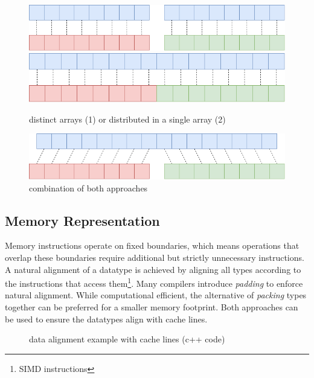 \documentclass{article}
\begin{document}
\begin{figure}[ht]
    \centering
    \includegraphics[scale=0.3]{variant1}
    \hspace{10pt}
    \includegraphics[scale=0.3]{variant2}
    \caption{distinct arrays (1) or distributed in a single array (2)}
\end{figure}

\begin{figure}[ht]
    \centering
    \includegraphics[scale=0.3]{variant3}
    \caption{combination of both approaches}
\end{figure}

\newpage

\subsection{Memory Representation}

Memory instructions operate on fixed boundaries, which means operations that overlap these boundaries require additional but strictly unnecessary instructions.
A natural alignment of a datatype is achieved by aligning all types according to the instructions that access them\footnote{SIMD instructions}. 
Many compilers introduce {\it padding} to enforce natural alignment.
While computational efficient, the alternative of {\it packing} types together can be preferred for a smaller memory footprint.  
Both approaches can be used to ensure the datatypes align with cache lines. 

\begin{figure}[ht]
    \centering
    \caption{data alignment example with cache lines (c++ code)}
\end{figure}
\end{document}
